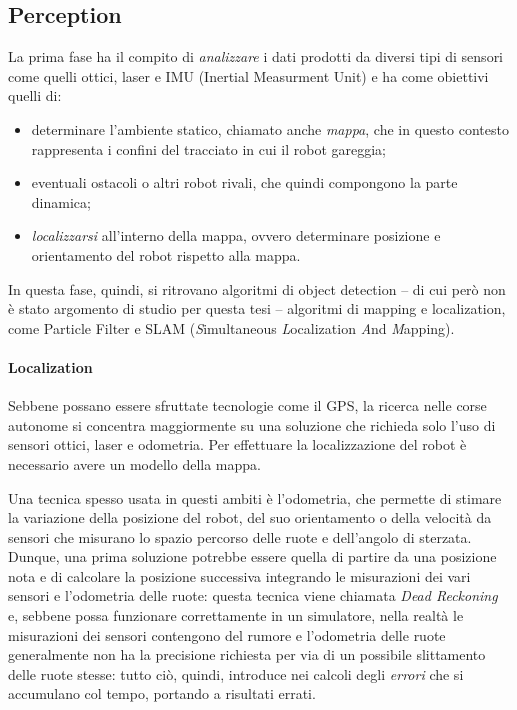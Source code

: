 \subsection{Perception} 
La prima fase ha il compito di \textit{analizzare} i dati prodotti da diversi tipi di sensori come quelli
ottici, laser e IMU (Inertial Measurment Unit) e ha come obiettivi quelli di: \cite{betz2022autonomous}
\begin{itemize}
	\item determinare l'ambiente statico, chiamato anche \textit{mappa}, che in questo contesto
	      rappresenta i confini del tracciato in cui il robot gareggia;
	\item eventuali ostacoli o altri robot rivali, che quindi compongono la
	      parte dinamica; 
	\item \textit{localizzarsi} all'interno della mappa, ovvero
	      determinare posizione e orientamento del robot rispetto alla mappa.
\end{itemize}
In questa fase, quindi, si ritrovano algoritmi di object detection -- di cui però non è stato argomento
di studio per questa tesi -- algoritmi di mapping e localization, come Particle Filter e SLAM
(\textit{S}imultaneous \textit{L}ocalization \textit{A}nd \textit{M}apping).

\paragraph{Localization}
Sebbene possano essere sfruttate tecnologie come il GPS, la ricerca nelle corse autonome si concentra
maggiormente su una soluzione che richieda solo l'uso di sensori ottici, laser e odometria.
\cite{betz2022autonomous} Per effettuare la localizzazione del robot è necessario avere un modello della
mappa.

Una tecnica spesso usata in questi ambiti è l'odometria, che permette di stimare la variazione della
posizione del robot, del suo orientamento o della velocità da sensori che misurano lo spazio percorso
delle ruote e dell'angolo di sterzata. Dunque, una prima soluzione potrebbe essere quella di partire da
una posizione nota e di calcolare la posizione successiva integrando le misurazioni dei vari sensori e
l'odometria delle ruote: questa tecnica viene chiamata \textit{Dead Reckoning} e, sebbene possa
funzionare correttamente in un simulatore, nella realtà le misurazioni dei sensori contengono del rumore
e l'odometria delle ruote generalmente non ha la precisione richiesta per via di un possibile slittamento
delle ruote stesse: tutto ciò, quindi, introduce nei calcoli degli \textit{errori} che si accumulano col
tempo, portando a risultati errati.

